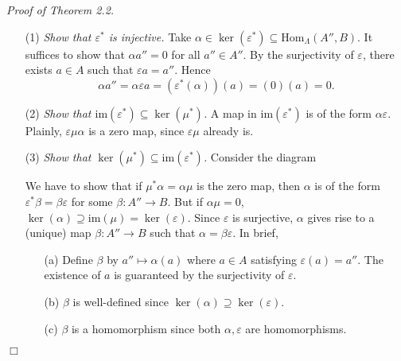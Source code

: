 \documentclass{article}
\begin{document}
\emph{Proof of Theorem 2.2.}
\begin{enumerate}
\item[(1)]
  \emph{Show that $\varepsilon^{*}$ is injective.}
  Take $\alpha \in \ker(\varepsilon^{*}) \subseteq \mathrm{Hom}_{\Lambda}(A'',B)$.
  It suffices to show that $\alpha a'' = 0$ for all $a'' \in A''$.
  By the surjectivity of $\varepsilon$, there exists $a \in A$ such that $\varepsilon a = a''$.
  Hence
  \[
    \alpha a'' = \alpha \varepsilon a = (\varepsilon^{*}(\alpha))(a) = (0)(a) = 0.
  \]

\item[(2)]
  \emph{Show that $\mathrm{im}(\varepsilon^{*}) \subseteq \ker(\mu^{*})$.}
  A map in $\mathrm{im}(\varepsilon^{*})$ is of the form $\alpha \varepsilon$.
  Plainly, $\varepsilon\mu\alpha$ is a zero map, since $\varepsilon\mu$ already is.

\item[(3)]
  \emph{Show that $\ker(\mu^{*}) \subseteq \mathrm{im}(\varepsilon^{*})$.}
  Consider the diagram
  \begin{center}
  \end{center}
  We have to show that if $\mu^{*}\alpha = \alpha\mu$ is the zero map,
  then $\alpha$ is of the form $\varepsilon^{*}\beta = \beta\varepsilon$ for some $\beta: A'' \to B$.
  But if $\alpha\mu = 0$, $\ker(\alpha) \supseteq \mathrm{im}(\mu) = \ker(\varepsilon)$.
  Since $\varepsilon$ is surjective, $\alpha$ gives rise to a (unique) map
  $\beta: A'' \to B$ such that $\alpha = \beta\varepsilon$.
  In brief,
  \begin{enumerate}
  \item[(a)]
    Define $\beta$ by $a'' \mapsto \alpha(a)$ where $a \in A$ satisfying $\varepsilon(a) = a''$.
    The existence of $a$ is guaranteed by the surjectivity of $\varepsilon$.

  \item[(b)]
    $\beta$ is well-defined since $\ker(\alpha) \supseteq \ker(\varepsilon)$.

  \item[(c)]
    $\beta$ is a homomorphism since both $\alpha, \varepsilon$ are homomorphisms.
  \end{enumerate}
\end{enumerate}
$\Box$ \\
\end{document}
